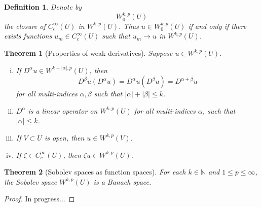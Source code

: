\documentclass[11pt]{article}
\newtheorem{theorem}{Theorem}
\newtheorem{definition}{Definition}
\theoremstyle{definition}
\begin{document}
\begin{definition}
	Denote by
	\begin{equation*}
		W_0^{k,p}(U)
	\end{equation*}
	the closure of $C_c^{\infty}(U)$ in $W^{k,p}(U)$.
	Thus $u \in W_0^{k,p}(U)$ if and only if there exists functions $u_m \in C_c^{\infty}(U)$
	such that $u_m \rightarrow u$ in $W^{k,p}(U)$.
\end{definition}

\begin{theorem}[Properties of weak derivatives]
	Suppose $u \in W^{k,p}(U)$.
	\begin{enumerate}[(i)]
		\item If $D^{\alpha}u \in W^{k-|\alpha|,p}(U)$, then
			\begin{equation*}
				D^{\beta}u(D^{\alpha}u) = D^{\alpha}u(D^{\beta}u) = D^{\alpha + \beta}u
			\end{equation*}
			for all multi-indices $\alpha,\beta$ such that $|\alpha| + |\beta| \leq k$.
		\item $D^{\alpha}$ is a linear operator on $W^{k,p}(U)$ for all multi-indices $\alpha$, such that $|\alpha| \leq k$.
		\item If $V \subset U$ is open, then $u \in W^{k,p}(V)$.
		\item If $\zeta \in C_c^{\infty}(U)$, then $\zeta u \in W^{k,p}(U)$.
	\end{enumerate}
\end{theorem}

\begin{theorem}[Sobolev spaces as function spaces]
	For each $k \in \mathbb{N}$ and $1 \leq p \leq \infty$, the Sobolev space $W^{k,p}(U)$ is a Banach space.
\end{theorem}
\begin{proof}
	In progress...
\end{proof}

\newpage
\end{document}
